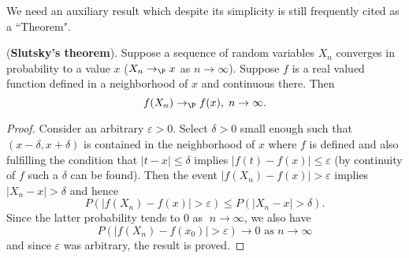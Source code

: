 We need an auxiliary result which despite its simplicity is still frequently
cited as a ``Theorem".

\begin{prop}
\label{theo-slutsky}(\textbf{Slutsky's theorem}). Suppose a sequence of
random variables $X_{n}$ converges in probability to a value $x$ ($%
X_{n}\rightarrow _{\P }x$ as $n\rightarrow \infty $). Suppose $f$ is a real
valued function defined in a neighborhood of $x$ and continuous there. Then 
\begin{equation*}
f(X_{n})\rightarrow _{\P }f(x),\;n\rightarrow \infty .
\end{equation*}
\end{prop}

\begin{proof}
Consider an arbitrary $\varepsilon >0$. Select $\delta >0$ small enough such
that $(x-\delta ,x+\delta )$ is contained in the neighborhood of $x$ where $%
f $ is defined and also fulfilling the condition that $\left\vert
t-x\right\vert \leq \delta $ implies $\left\vert f(t)-f(x)\right\vert \leq
\varepsilon $ (by continuity of $f$ such a $\delta $ can be found). Then the
event $\left\vert f(X_{n})-f(x)\right\vert >\varepsilon $ implies $%
\left\vert X_{n}-x\right\vert >\delta $ and hence 
\begin{equation*}
P\left( \left\vert f(X_{n})-f(x)\right\vert >\varepsilon \right) \leq
P\left( \left\vert X_{n}-x\right\vert >\delta \right) .
\end{equation*}%
Since the latter probability tends to $0$ as $\;n\rightarrow \infty $, we
also have 
\begin{equation*}
P\left( \left\vert f(X_{n})-f(x_{0})\right\vert >\varepsilon \right)
\rightarrow 0\text{ as }n\rightarrow \infty
\end{equation*}%
and since $\varepsilon $ was arbitrary, the result is proved.\bigskip
\end{proof}


\remove{

}
